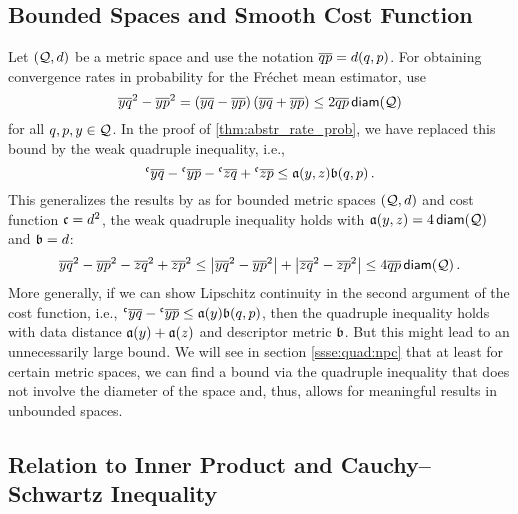 \subsection{Bounded Spaces and Smooth Cost Function}\label{ssec:bounded}
%
Let $(\mathcal{Q}, d)$ be a metric space and use the notation $\overline{qp} = d(q,p)$.
For obtaining convergence rates in probability for the Fréchet mean estimator, \cite{petersen16} use 
\begin{equation*}
	 \overline{yq}^2 - \overline{yp}^2 = \left( \overline{yq} - \overline{yp} \right)\left( \overline{yq} + \overline{yp} \right) \leq 2 \overline{qp} \operatorname{\mathsf{diam}}(\mathcal{Q})
\end{equation*}
for all $q,p,y\in\mathcal{Q}$.
In the proof of \autoref{thm:abstr_rate_prob}, we have replaced this bound by the weak quadruple inequality, i.e.,
\begin{equation*}
	\olc yq - \olc yp - \olc zq + \olc zp \leq \mf a(y,z) \mf b(q,p)
	\eqfs
\end{equation*}
This generalizes the results by \cite{petersen16} as for bounded metric spaces $(\mathcal{Q}, d)$ and cost function $\mathfrak{c} = d^2$, the weak quadruple inequality holds with $\mathfrak{a}(y,z) = 4 \operatorname{\mathsf{diam}}(\mathcal{Q})$ and $\mathfrak{b} = d$:
\begin{equation*}
	\overline{yq}^2 - \overline{yp}^2 - \overline{zq}^2 + \overline{zp}^2 \leq \left| \overline{yq}^2 - \overline{yp}^2 \right| + \left| \overline{zq}^2 - \overline{zp}^2 \right| \leq 4 \overline{qp} \operatorname{\mathsf{diam}}(\mathcal{Q})
	\, .
\end{equation*}
%
More generally, if we can show Lipschitz continuity in the second argument of the cost function, i.e., $\olc yq - \olc yp \leq \mf a(y) \mf b(q,p)$, then the quadruple inequality holds with data distance $\mathfrak{a}(y)+\mathfrak{a}(z)$ and descriptor metric $\mathfrak{b}$.
But this might lead to an unnecessarily large bound. We will see in section \ref{ssse:quad:npc} that at least for certain metric spaces, we can find a bound via the quadruple inequality that does not involve the diameter of the space and, thus, allows for meaningful results in unbounded spaces.
%
%
%
\subsection{Relation to Inner Product and Cauchy--Schwartz Inequality}\label{ssec:quad:ip}
%
